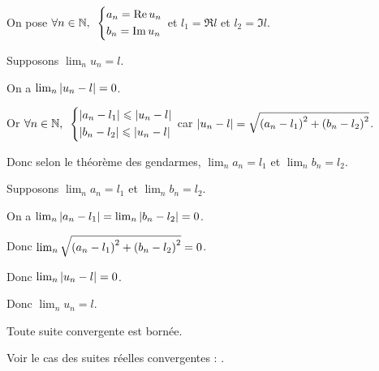 \begin{dem}~\\
On pose \(\quantifs{\forall n\in\N}\begin{dcases}a_n=\Re u_n \\ b_n=\Im u_n\end{dcases}\) et \(l_1=\Re l\) et \(l_2=\Im l\).

\impdir

Supposons \(\lim_nu_n=l\).

On a \(\lim_n\left\lvert u_n-l\right\rvert=0\).

Or \(\quantifs{\forall n\in\N}\begin{dcases}\abs{a_n-l_1}\leq\abs{u_n-l} \\ \abs{b_n-l_2}\leq\abs{u_n-l}\end{dcases}\) car \(\left\lvert u_n-l\right\rvert=\sqrt{\left(a_n-l_1\right)^2+\left(b_n-l_2\right)^2}\).

Donc selon le théorème des gendarmes, \(\lim_na_n=l_1\) et \(\lim_nb_n=l_2\).

\imprec

Supposons \(\lim_na_n=l_1\) et \(\lim_nb_n=l_2\).

On a \(\lim_n\left\lvert a_n-l_1\right\rvert=\lim_n\left\lvert b_n-l_2\right\rvert=0\).

Donc \(\lim_n\sqrt{\left(a_n-l_1\right)^2+\left(b_n-l_2\right)^2}=0\).

Donc \(\lim_n\left\lvert u_n-l\right\rvert=0\).

Donc \(\lim_nu_n=l\).
\end{dem}

\begin{prop}
Toute suite convergente est bornée.
\end{prop}

\begin{dem}
Voir le cas des suites réelles convergentes : .
\end{dem}

